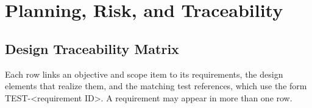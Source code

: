 
\chapter{Planning, Risk, and Traceability}
\label{chap:planning}

\section{Design Traceability Matrix}
Each row links an objective and scope item to its requirements, the design elements
that realize them, and the matching test references, which use the form
TEST-<requirement ID>. A requirement may appear in more than one row.

